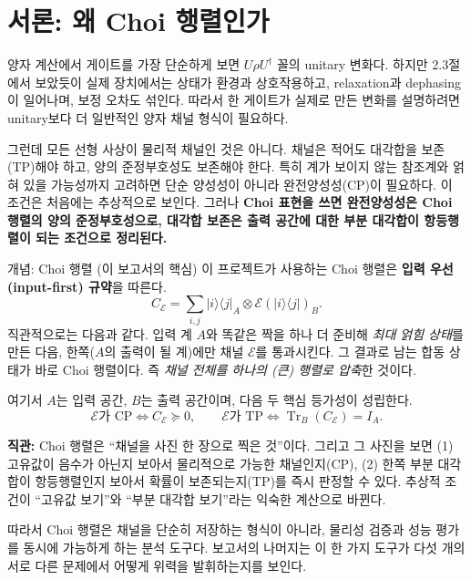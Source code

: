 \documentclass[11pt,a4paper]{article}
\newcommand{\E}{\mathcal{E}}
\newcommand{\Tr}{\operatorname{Tr}}
\begin{document}
\section{서론: 왜 Choi 행렬인가}

양자 계산에서 게이트를 가장 단순하게 보면 $U\rho U^\dagger$ 꼴의 unitary 변화다. 하지만 2.3절에서 보았듯이 실제 장치에서는 상태가 환경과 상호작용하고, relaxation과 dephasing이 일어나며, 보정 오차도 섞인다. 따라서 한 게이트가 실제로 만든 변화를 설명하려면 unitary보다 더 일반적인 양자 채널 형식이 필요하다.

그런데 모든 선형 사상이 물리적 채널인 것은 아니다. 채널은 적어도 대각합을 보존(TP)해야 하고, 양의 준정부호성도 보존해야 한다. 특히 계가 보이지 않는 참조계와 얽혀 있을 가능성까지 고려하면 단순 양성성이 아니라 완전양성성(CP)이 필요하다. 이 조건은 처음에는 추상적으로 보인다. 그러나 \textbf{Choi 표현을 쓰면 완전양성성은 Choi 행렬의 양의 준정부호성으로, 대각합 보존은 출력 공간에 대한 부분 대각합이 항등행렬이 되는 조건으로 정리된다.}

\begin{conceptbox}{개념: Choi 행렬 (이 보고서의 핵심)}
이 프로젝트가 사용하는 Choi 행렬은 \textbf{입력 우선(input-first) 규약}을 따른다.
\[
C_{\E}=\sum_{i,j}|i\rangle\langle j|_A\otimes \E(|i\rangle\langle j|)_B .
\]
직관적으로는 다음과 같다. 입력 계 $A$와 똑같은 짝을 하나 더 준비해 \emph{최대 얽힘 상태}를 만든 다음, 한쪽($A$의 출력이 될 계)에만 채널 $\E$를 통과시킨다. 그 결과로 남는 합동 상태가 바로 Choi 행렬이다. 즉 \emph{채널 전체를 하나의 (큰) 행렬로 압축}한 것이다.

여기서 $A$는 입력 공간, $B$는 출력 공간이며, 다음 두 핵심 등가성이 성립한다.
\[
\E\text{가 CP} \iff C_{\E}\succeq 0,
\qquad
\E\text{가 TP} \iff \Tr_B(C_{\E})=I_A.
\]
\end{conceptbox}

\begin{intuitionbox}
\textbf{직관:} Choi 행렬은 ``채널을 사진 한 장으로 찍은 것''이다. 그리고 그 사진을 보면 (1) 고유값이 음수가 아닌지 보아서 물리적으로 가능한 채널인지(CP), (2) 한쪽 부분 대각합이 항등행렬인지 보아서 확률이 보존되는지(TP)를 즉시 판정할 수 있다. 추상적 조건이 ``고유값 보기''와 ``부분 대각합 보기''라는 익숙한 계산으로 바뀐다.
\end{intuitionbox}

따라서 Choi 행렬은 채널을 단순히 저장하는 형식이 아니라, 물리성 검증과 성능 평가를 동시에 가능하게 하는 분석 도구다. 보고서의 나머지는 이 한 가지 도구가 다섯 개의 서로 다른 문제에서 어떻게 위력을 발휘하는지를 보인다.
\end{document}
